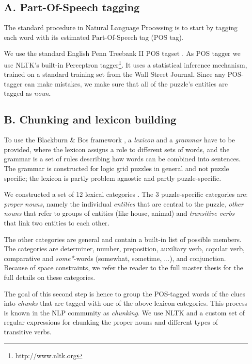 \subsection{A. Part-Of-Speech tagging}
The standard procedure in Natural Language Processing is to start by tagging each word with its estimated Part-Of-Speech tag (POS tag). %

We use the standard English Penn Treebank II POS tagset \cite{DBLP:journals/coling/MarcusSM94}. As POS tagger we use NLTK's built-in Perceptron tagger\footnote{http://www.nltk.org}. It uses a statistical inference mechanism, trained on a standard training set from the Wall Street Journal. 
Since any POS-tagger can make mistakes, we make sure that all of the puzzle's entities are tagged as \textit{noun}.

\subsection{B. Chunking and lexicon building}
To use the Blackburn \& Bos framework \cite{Blackburn2005,Blackburn2006}, a \textit{lexicon} and a \textit{grammar} have to be provided, where the lexicon assigns a role to different sets of words, and the grammar is a set of rules describing how words can be combined into sentences. The grammar is constructed for logic grid puzzles in general and not puzzle specific; the lexicon is partly problem agnostic and partly puzzle-specific.

We constructed a set of 12 lexical categories \cite{msc/Claes17}. The 3 puzzle-specific categories are: \textit{proper nouns}, namely the individual \textit{entities} that are central to the puzzle, \textit{other nouns} that refer to groups of entities (like house, animal) and \textit{transitive verbs} that link two entities to each other.

The other categories are general and contain a built-in list of possible members. The categories are determiner, number, preposition, auxiliary verb, copular verb, comparative and \textit{some*}-words (somewhat, sometime, ...), and conjunction. Because of space constraints, we refer the reader to the full master thesis for the full details on these categories.


The goal of this second step is hence to group the POS-tagged words of the clues into \textit{chunks} that are tagged with one of the above lexicon categories. This process is known in the NLP community as \textit{chunking}. We use NLTK and a custom set of regular expressions for chunking the proper nouns and different types of transitive verbs. %

